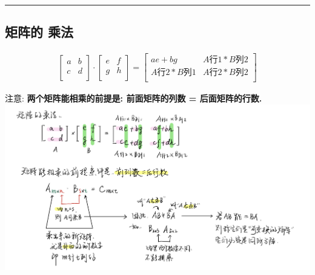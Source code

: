 \documentclass[UTF8]{ctexart}
\begin{document}
\hrule


\subsection{矩阵的 乘法}	

\begin{align*}
	\left[ \begin{matrix}
		a&		b\\
		\hline
		c&		d\\
	\end{matrix} \right] 
\cdot 
\left[ \begin{array}{c|cc}
		e&		f\\
		g&		h\\
	\end{array} \right] =\left[ \begin{matrix}
		ae+bg&		A\text{行}1*B\text{列}2\\
		A\text{行}2*B\text{列}1&		A\text{行}2*B\text{列}2\\
	\end{matrix} \right]
\end{align*}


注意: \textbf{两个矩阵能相乘的前提是: 前面矩阵的列数 = 后面矩阵的行数.} \\
\includegraphics[width=1\textwidth]{img/0016.png} 
\end{document}

